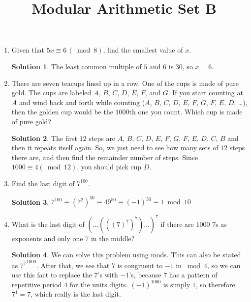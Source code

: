 \documentclass{article}
\title{Modular Arithmetic Set B}
\date{}
\author{}
\theoremstyle{definition}
\newtheorem*{solution}{Solution}
\begin{document}
\maketitle
\begin{multicols}{2}
    \raggedcolumns
    \begin{enumerate}
        \item Given that $5x \equiv 6 \, (\bmod 8)$, find the smallest value of $x$.
            \begin{solution}
                The least common multiple of $5$ and $6$ is $30$, so $x = 6$.
            \end{solution}
        \item There are seven teacups lined up in a row.
            One of the cups is made of pure gold.
            The cups are labeled $A$, $B$, $C$, $D$, $E$, $F$, and $G$.
            If you start counting at $A$ and wind back and forth while counting ($A$, $B$, $C$, $D$, $E$, $F$, $G$, $F$, $E$, $D$, \dots), then the golden cup would be the $1000$th one you count.
            Which cup is made of pure gold?
            \begin{solution}
                The first $12$ steps are $A$, $B$, $C$, $D$, $E$, $F$, $G$, $F$, $E$, $D$, $C$, $B$ and then it repeats itself again.
                So, we just need to see how many sets of $12$ steps there are, and then find the remainder number of steps.
                Since $1000 \equiv 4 (\bmod 12)$, you should pick cup $D$.
            \end{solution}
        \item Find the last digit of $7^{100}$.
            \begin{solution}
                $7^{100} \equiv \left( 7^2 \right)^50 \equiv 49^50 \equiv (-1)^50 \equiv 1 \bmod 10$
            \end{solution}
        \item What is the last digit of $(\dots(((7)^7)^7)\dots)^7$ if there are $1000$ $7$s as exponents and only one $7$ in the middle?
            \begin{solution}
                We can solve this problem using mods. This can also be stated as ${7^7}^{1000}$.
                After that, we see that $7$ is congruent to $-1$ in $\bmod 4$, so we can use this fact to replace the $7$'s with $-1$'s, because $7$ has a pattern of repetitive period $4$ for the units digits.
                $(-1)^{1000}$ is simply $1$, so therefore $7^1 = 7$, which really is the last digit.
            \end{solution}

\end{enumerate}
\end{multicols}
\end{document}
